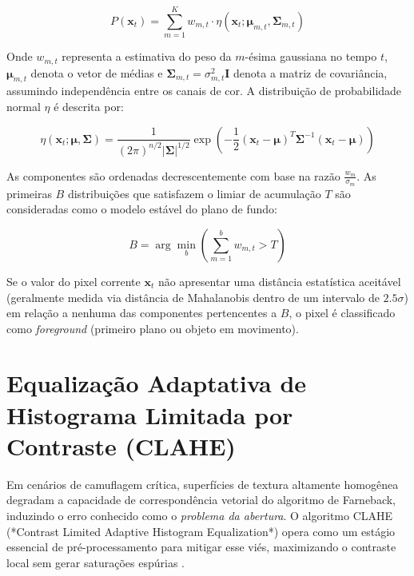 \begin{equation}
    P(\mathbf{x}_t) = \sum_{m=1}^{K} w_{m,t} \cdot \eta(\mathbf{x}_t; \boldsymbol{\mu}_{m,t}, \boldsymbol{\Sigma}_{m,t})
\end{equation}

Onde $w_{m,t}$ representa a estimativa do peso da $m$-ésima gaussiana no tempo $t$, $\boldsymbol{\mu}_{m,t}$ denota o vetor de médias e $\boldsymbol{\Sigma}_{m,t} = \sigma_{m,t}^2 \mathbf{I}$ denota a matriz de covariância, assumindo independência entre os canais de cor. A distribuição de probabilidade normal $\eta$ é descrita por:

\begin{equation}
    \eta(\mathbf{x}_t; \boldsymbol{\mu}, \boldsymbol{\Sigma}) = \frac{1}{(2\pi)^{n/2} |\boldsymbol{\Sigma}|^{1/2}} \exp\left( -\frac{1}{2}(\mathbf{x}_t - \boldsymbol{\mu})^T \boldsymbol{\Sigma}^{-1} (\mathbf{x}_t - \boldsymbol{\mu}) \right)
\end{equation}

As componentes são ordenadas decrescentemente com base na razão $\frac{w_m}{\sigma_m}$. As primeiras $B$ distribuições que satisfazem o limiar de acumulação $T$ são consideradas como o modelo estável do plano de fundo:

\begin{equation}
    B = \arg\min_b \left( \sum_{m=1}^{b} w_{m,t} > T \right)
\end{equation}

Se o valor do pixel corrente $\mathbf{x}_t$ não apresentar uma distância estatística aceitável (geralmente medida via distância de Mahalanobis dentro de um intervalo de $2.5\sigma$) em relação a nenhuma das componentes pertencentes a $B$, o pixel é classificado como \textit{foreground} (primeiro plano ou objeto em movimento).

\section{Equalização Adaptativa de Histograma Limitada por Contraste (CLAHE)}
\label{sec:clahe}

Em cenários de camuflagem crítica, superfícies de textura altamente homogênea degradam a capacidade de correspondência vetorial do algoritmo de Farneback, induzindo o erro conhecido como o \textit{problema da abertura}. O algoritmo CLAHE (*Contrast Limited Adaptive Histogram Equalization*) opera como um estágio essencial de pré-processamento para mitigar esse viés, maximizando o contraste local sem gerar saturações espúrias \cite{zuiderveld1994contrast}.

